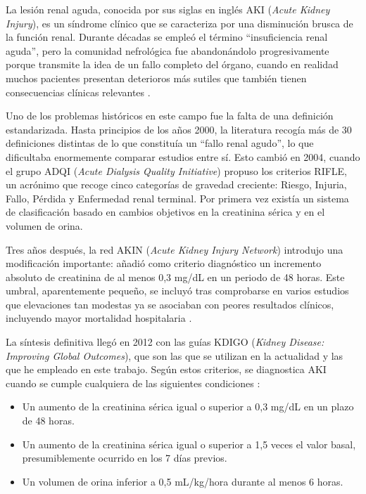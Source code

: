 \documentclass[12pt, a4paper, oneside]{report}
\begin{document}
La lesión renal aguda, conocida por sus siglas en inglés AKI (\textit{Acute Kidney Injury}), es un síndrome clínico que se caracteriza por una disminución brusca de la función renal. Durante décadas se empleó el término ``insuficiencia renal aguda'', pero la comunidad nefrológica fue abandonándolo progresivamente porque transmite la idea de un fallo completo del órgano, cuando en realidad muchos pacientes presentan deterioros más sutiles que también tienen consecuencias clínicas relevantes \parencite{kdigo2012aki}.

Uno de los problemas históricos en este campo fue la falta de una definición estandarizada. Hasta principios de los años 2000, la literatura recogía más de 30 definiciones distintas de lo que constituía un ``fallo renal agudo'', lo que dificultaba enormemente comparar estudios entre sí. Esto cambió en 2004, cuando el grupo ADQI (\textit{Acute Dialysis Quality Initiative}) propuso los criterios RIFLE, un acrónimo que recoge cinco categorías de gravedad creciente: Riesgo, Injuria, Fallo, Pérdida y Enfermedad renal terminal. Por primera vez existía un sistema de clasificación basado en cambios objetivos en la creatinina sérica y en el volumen de orina.

Tres años después, la red AKIN (\textit{Acute Kidney Injury Network}) introdujo una modificación importante: añadió como criterio diagnóstico un incremento absoluto de creatinina de al menos 0,3 mg/dL en un periodo de 48 horas. Este umbral, aparentemente pequeño, se incluyó tras comprobarse en varios estudios que elevaciones tan modestas ya se asociaban con peores resultados clínicos, incluyendo mayor mortalidad hospitalaria \parencite{khwaja2012kdigo}.

La síntesis definitiva llegó en 2012 con las guías KDIGO (\textit{Kidney Disease: Improving Global Outcomes}), que son las que se utilizan en la actualidad y las que he empleado en este trabajo. Según estos criterios, se diagnostica AKI cuando se cumple cualquiera de las siguientes condiciones \parencite{kdigo2012aki}:

\begin{itemize}
    \item Un aumento de la creatinina sérica igual o superior a 0,3 mg/dL en un plazo de 48 horas.
    \item Un aumento de la creatinina sérica igual o superior a 1,5 veces el valor basal, presumiblemente ocurrido en los 7 días previos.
    \item Un volumen de orina inferior a 0,5 mL/kg/hora durante al menos 6 horas.
\end{itemize}
\end{document}
